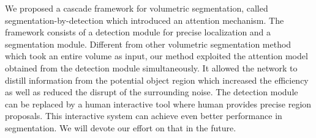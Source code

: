 We proposed a cascade framework for volumetric segmentation, called segmentation-by-detection which introduced an attention mechanism. The framework consists of a detection module for precise localization and a segmentation module. Different from other volumetric segmentation method which took an entire volume as input, our method exploited the attention model obtained from the detection module simultaneously. It allowed the network to distill information from the potential object region which increased the efficiency as well as reduced the disrupt of the surrounding noise. 
The detection module can be replaced by a human interactive tool where human provides precise region proposals. This interactive system can achieve even better performance in segmentation.
We will devote our effort on that in the future.